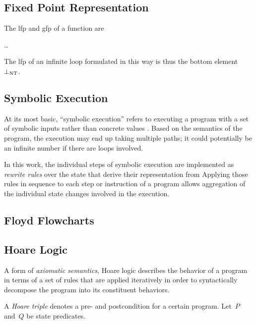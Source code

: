 \subsection{Fixed Point Representation}
The \ac{lfp} and \ac{gfp} of a function are

\todo\dots

The \ac{lfp} of an infinite loop formulated in this way
is thus the bottom element $\bot_\mathrm{NT}$.%

\subsection{Symbolic Execution}
At its most basic, ``symbolic execution'' refers to
executing a program with a set of symbolic inputs
rather than concrete values \autocite{king1976symbolic}.
Based on the semantics of the program, the execution may end up taking multiple paths;
it could potentially be an infinite number if there are loops involved.


In this work, the individual steps of symbolic execution
are implemented as \emph{rewrite rules} over the state%
that derive their representation from 
Applying those rules in sequence to each step or instruction of a program
allows aggregation of the individual state changes involved in the execution.

\subsection{Floyd Flowcharts}\label{se:floyd}

\subsection{Hoare Logic}\label{se:hoare}
A form of \emph{axiomatic semantics},
Hoare logic \autocite{hoare1969axiomatic,myreen2007hoare}%
describes the behavior of a program
in terms of a set of rules that are applied iteratively
in order to syntactically decompose the program into its constituent behaviors.

A \emph{Hoare triple} denotes a pre- and postcondition for a certain program.%
%
%
Let~$P$ and~$Q$ be state predicates.


